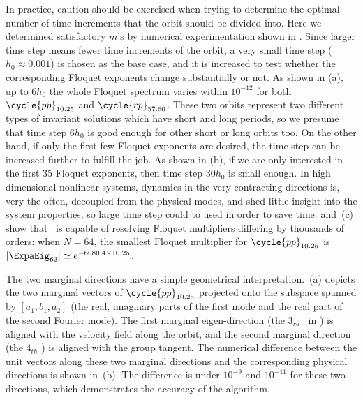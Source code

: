 In practice, caution should be
exercised when trying to determine the optimal number of time increments
that the orbit should be divided into. Here we determined satisfactory $m$'s by numerical
experimentation shown in . Since larger time step means
fewer time increments of the orbit, a very small time step ($h_0 \approx 0.001$)
is chosen as the base case, and it is increased to test whether the
corresponding Floquet exponents change substantially or not. As shown in
 (a), up to $6h_0$ the whole Floquet spectrum varies within
$10^{-12}$ for both $\cycle{pp}_{10.25}$ and $\cycle{rp}_{57.60}$. These
two orbits represent two different types of invariant solutions which have
short and long periods, so we presume that time step $6h_0$ is good enough
for other short or long orbits too. On the other hand, if only the first
few Floquet exponents are desired, the time step can be increased further
to fulfill the job. As shown in  (b), if we are only
interested in the first 35 Floquet exponents, then time step $30h_0$ is small
enough. In high dimensional nonlinear systems, dynamics in the very contracting
directions is, very the often, decoupled from the physical modes, and shed little
insight into the system properties, so large time step could to used in order to
save time.
 and
\,(c) show that \psd\ is capable of resolving
Floquet multipliers differing by thousands of orders:
when $N=64$, the smallest Floquet multiplier  for $\cycle{pp}_{10.25}$ is
$|\ExpaEig_{62}| \simeq e^{-6080.4\times 10.25}$.

The two marginal directions have a simple geometrical interpretation.
\,(a) depicts the two marginal vectors of
$\cycle{pp}_{10.25}$ projected onto the subspace spanned by $[a_1, b_{1}, a_{2}]$
(the real, imaginary parts of the first mode and the real part of the
second Fourier mode). The first marginal eigen-direction (the $3_{rd}$
\Fv\ in  ) is aligned with the velocity
field along the orbit, and the second marginal direction (the $4_{th}$
\Fv) is aligned with the group tangent. The numerical
difference between the unit vectors along these two marginal directions
and the corresponding physical directions is shown in
\,(b). The difference is under $10^{-9}$ and
$10^{-11}$ for these two directions, which demonstrates the accuracy of
the algorithm.



